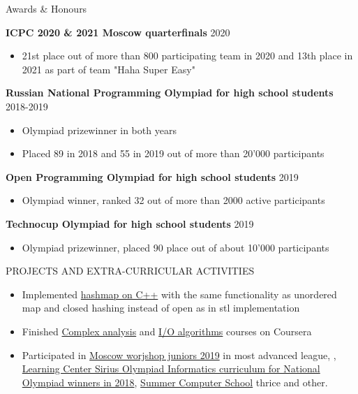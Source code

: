 \begin{rSection}{Awards \& Honours}

\textbf{ICPC 2020  \& 2021 Moscow quarterfinals} \hfill 2020
 \begin{itemize}
    \itemsep -3pt {} 
        \item 21st place out of more than 800 participating team in 2020 and 13th place in 2021 as part of team "Haha Super Easy" 
 \end{itemize}
 
\textbf{Russian National Programming Olympiad for high school students} \hfill 2018-2019
 \begin{itemize}
    \itemsep -3pt {} 
        \item Olympiad prizewinner in both years
     \item Placed 89 in 2018 and 55 in 2019 out of more than 20'000 participants
 \end{itemize}

\textbf{Open Programming Olympiad for high school students} \hfill 2019
 \begin{itemize}
    \itemsep -3pt {} 
        \item Olympiad winner, ranked 32 out of more than 2000 active participants
 \end{itemize}

\textbf{Technocup Olympiad for high school students} \hfill 2019
 \begin{itemize}
    \itemsep -3pt {} 
        \item Olympiad prizewinner, placed 90 place out of about 10'000 participants
 \end{itemize}

\end{rSection}

\begin{rSection}{PROJECTS AND EXTRA-CURRICULAR ACTIVITIES}
\begin{itemize}

\item {Implemented \href{https://github.com/Oanikulin/HashMap}{hashmap on C++} with the same functionality as unordered map and closed hashing instead of open as in stl implementation}
\item {Finished \href{https://coursera.org/share/4015703bf16f605537f5b29a1746dfe9}{ 
    Complex analysis} and \href{https://coursera.org/share/5378026a81ad6bbf81ffaed2c7062583}{I/O algorithms} courses on Coursera}
\item  {Participated in \href{https://it-edu.com/ru/%D1%88%D0%BA%D0%BE%D0%BB%D1%8C%D0%BD%D0%B8%D0%BA%D0%B0%D0%BC/%D0%B7%D0%B8%D0%BC%D0%BD%D1%8F%D1%8F-%D0%BA%D0%BE%D0%BC%D0%BF%D1%8C%D1%8E%D1%82%D0%B5%D1%80%D0%BD%D0%B0%D1%8F-%D1%88%D0%BA%D0%BE%D0%BB%D0%B0/zksh2019}{Moscow worjshop juniors 2019} in most advanced league, , \href{https://sochisirius.ru/obuchenie/nauka/smena170/752}{Learning Center Sirius Olympiad Informatics curriculum for National Olympiad winners in 2018}, \href{https://lksh.ru/}{Summer Computer School} thrice and other}.
\end{itemize}
\end{rSection} 
 
